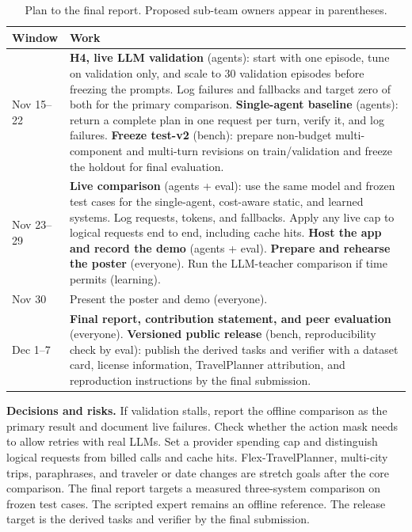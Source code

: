 \documentclass{article}
\begin{document}
\begin{table}[t]
\centering
\caption{Plan to the final report. Proposed sub-team owners appear in parentheses.}
\label{tab:plan}
\small
\begin{tabular}{@{}>{\raggedright\arraybackslash}p{}>{\raggedright\arraybackslash}p{}@{}}
\toprule
\textbf{Window} & \textbf{Work} \\
\midrule
Nov 15--22 &
\textbf{H4, live LLM validation} (agents): start with one episode, tune on
validation only, and scale to 30 validation episodes before freezing the
prompts. Log failures and fallbacks and target zero of both for the primary
comparison. \textbf{Single-agent baseline} (agents): return a complete plan
in one request per turn, verify it, and log failures.
\textbf{Freeze test-v2} (bench): prepare non-budget multi-component and
multi-turn revisions on train/validation and freeze the holdout for final
evaluation. \\
Nov 23--29 &
\textbf{Live comparison} (agents + eval): use the same model and frozen
test cases for the single-agent, cost-aware static, and learned systems.
Log requests, tokens, and fallbacks. Apply any live cap to logical requests
end to end, including cache hits. \textbf{Host the app and record the demo}
(agents + eval). \textbf{Prepare and rehearse the poster} (everyone).
Run the LLM-teacher comparison if time permits (learning). \\
Nov 30 & Present the poster and demo (everyone). \\
Dec 1--7 &
\textbf{Final report, contribution statement, and peer evaluation}
(everyone). \textbf{Versioned public release} (bench, reproducibility check
by eval): publish the derived tasks and verifier with a dataset card,
license information, TravelPlanner attribution, and reproduction instructions
by the final submission. \\
\bottomrule
\end{tabular}
\end{table}

\textbf{Decisions and risks.} If validation stalls, report the offline
comparison as the primary result and document live failures. Check whether
the action mask needs to allow retries with real LLMs. Set a provider
spending cap and distinguish logical requests from billed calls and cache
hits. Flex-TravelPlanner, multi-city trips, paraphrases, and traveler or date
changes are stretch goals after the core comparison. The final report
targets a measured three-system comparison on frozen test cases. The
scripted expert remains an offline reference. The release target is the
derived tasks and verifier by the final submission.

\FloatBarrier


\end{document}
